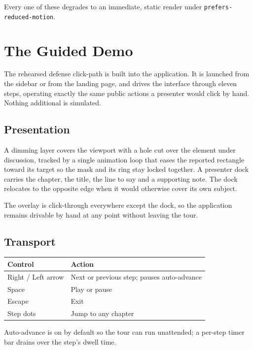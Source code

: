 \documentclass[11pt,a4paper]{report}
\newcommand{\code}[1]{\texttt{\small #1}}
\begin{document}
Every one of these degrades to an immediate, static render under
\code{prefers-reduced-motion}.

\chapter{The Guided Demo}
\label{ch:tour}

The rehearsed defense click-path is built into the application. It is launched
from the sidebar or from the landing page, and drives the interface through
eleven steps, operating exactly the same public actions a presenter would click
by hand. Nothing additional is simulated.

\section{Presentation}

A dimming layer covers the viewport with a hole cut over the element under
discussion, tracked by a single animation loop that eases the reported
rectangle toward its target so the mask and its ring stay locked together. A
presenter dock carries the chapter, the title, the line to say and a
supporting note. The dock relocates to the opposite edge when it would
otherwise cover its own subject.

The overlay is click-through everywhere except the dock, so the application
remains drivable by hand at any point without leaving the tour.

\section{Transport}

\begin{center}
\begin{tabular}{ll}
\toprule
\textbf{Control} & \textbf{Action} \\
\midrule
Right / Left arrow & Next or previous step; pauses auto-advance \\
Space & Play or pause \\
Escape & Exit \\
Step dots & Jump to any chapter \\
\bottomrule
\end{tabular}
\end{center}

Auto-advance is on by default so the tour can run unattended; a per-step timer
bar drains over the step's dwell time.
\end{document}
